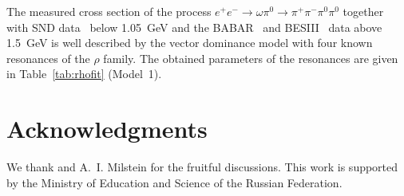 \documentclass[twocolumn,aps,prd,floatfix,nofootinbib,superscriptaddress]{revtex4-2}
\begin{document}
The measured cross section of the process \( e^+e^- \to \omega\pi^0 \to \pi^+\pi^-\pi^0\pi^0 \) together with SND data~\cite{snd2000b,snd2000a,snd2009} below 1.05~GeV and the BABAR~\cite{babar17} and BESIII~\cite{bes2021} data above 1.5~GeV is well described by the vector dominance model with four known resonances of the $\rho$ family.
The obtained parameters of the resonances are given in Table~\ref{tab:rhofit} (Model~1).

\section{Acknowledgments}

We thank  and A.~I. Milstein for the fruitful discussions.
This work is supported by the Ministry of Education and Science of the Russian Federation.
\end{document}
